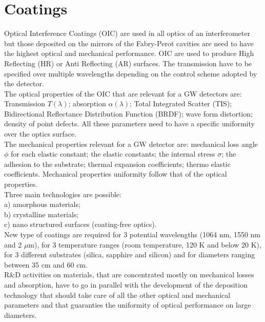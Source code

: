 \section{Coatings}
\label{sec:coatingsintro}
Optical Interference Coatings (OIC) are used in all optics of an interferometer but those deposited on the mirrors of the Fabry-Perot cavities are need to have the highest optical and mechanical performance. OIC are used to produce High Reflecting (HR) or Anti Reflecting (AR) surfaces. The transmission have to be specified over multiple wavelengths depending on the control scheme adopted by the detector. \\

The optical properties of the OIC that are relevant for a GW detectors are: Transmission $T(\lambda)$; absorption $\alpha(\lambda)$; Total Integrated Scatter (TIS); Bidirectional Reflectance Distribution Function (BRDF); wave form distortion; density of point defects. All these parameters need to have a specific uniformity over the optics surface. \\
The mechanical properties relevant for a GW detector are: mechanical loss angle $\phi$ for each elastic constant; the elastic constants; the internal stress $\sigma$; the adhesion to the substrate; thermal expansion coefficients; thermo elastic coefficients. Mechanical properties uniformity follow that of the optical properties.\\ 

Three main technologies are possible:\\
a) amorphous materials; \\
b) crystalline materials; \\
c) nano structured surfaces (coating-free optics). \\

New type of coatings are required for 3 potential wavelengths (1064 nm, 1550 nm and 2 $\mu$m), for 3 temperature ranges (room temperature, 120 K and below 20 K), for 3 different substrates (silica, sapphire and silicon) and for diameters ranging between 35 cm and 60 cm. \\

R\&D activities on materials, that are concentrated mostly on mechanical losses and absorption, have to go in parallel with the development of the deposition technology that should take care of all the other optical and mechanical parameters and that guaranties the uniformity of optical performance on large diameters.

